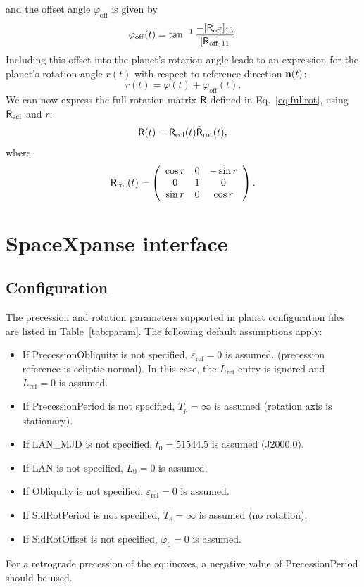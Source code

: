 \documentclass[a4paper]{article}
\renewcommand{\vec}[1]{\ensuremath \mathbf{#1}}
\newcommand{\mat}[1]{\ensuremath \mathsf{#1}}
\begin{document}
and the offset angle $\varphi_\mathrm{off}$ is given by
\begin{equation}
\varphi_\mathrm{off}(t) = \tan^{-1} \frac{-[\mat{R}_\mathrm{off}]_{13}}{[\mat{R}_\mathrm{off}]_{11}}.
\end{equation}
Including this offset into the planet's rotation angle leads to an expression for the planet's rotation angle $r(t)$ with respect to reference direction $\vec{n}(t)$:
\begin{equation}\label{eq:rotangle}
r(t) = \varphi(t) + \varphi_\mathrm{off}(t).
\end{equation}
We can now express the full rotation matrix $\mat{R}$ defined in Eq.~\ref{eq:fullrot}, using $\mat{R}_\mathrm{ecl}$ and $r$:
\begin{equation}
\mat{R}(t) = \mat{R}_\mathrm{ecl}(t) \tilde{\mat{R}}_\mathrm{rot}(t),
\end{equation}
where
\begin{equation}
\tilde{\mat{R}}_\mathrm{rot}(t) = \left( \begin{array}{ccc}
\cos r & 0 & -\sin r \\
0 & 1 & 0 \\
\sin r & 0 & \cos r
\end{array} \right).
\end{equation}

\section{SpaceXpanse interface}
\subsection{Configuration}
The precession and rotation parameters supported in planet configuration files are listed in Table~\ref{tab:param}.
The following default assumptions apply:
\begin{itemize}
\item If PrecessionObliquity is not specified, $\varepsilon_\mathrm{ref}=0$ is assumed. (precession reference is ecliptic normal). In this case, the $L_\mathrm{ref}$ entry is ignored and $L_\mathrm{ref}=0$ is assumed.
\item If PrecessionPeriod is not specified, $T_p = \infty$ is assumed (rotation axis is stationary).
\item If LAN\_MJD is not specified, $t_0 = 51544.5$ is assumed (J2000.0).
\item If LAN is not specified, $L_0=0$ is assumed.
\item If Obliquity is not specified, $\varepsilon_\mathrm{rel}=0$ is assumed.
\item If SidRotPeriod is not specified, $T_s=\infty$ is assumed (no rotation).
\item If SidRotOffset is not specified, $\varphi_0=0$ is assumed.
\end{itemize}
For a retrograde precession of the equinoxes, a negative value of PrecessionPeriod should be used.
\end{document}
